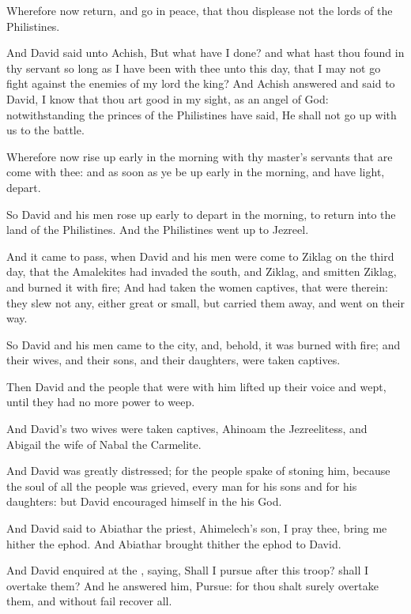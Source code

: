 \Verse Wherefore now return, and go in peace, that thou displease not the lords of the Philistines.

\Verse And David said unto Achish, But what have I done? and what hast thou found in thy servant so long as I have been with thee unto this day, that I may not go fight against the enemies of my lord the king?  \Verse And Achish answered and said to David, I know that thou art good in my sight, as an angel of God: notwithstanding the princes of the Philistines have said, He shall not go up with us to the battle.

\Verse Wherefore now rise up early in the morning with thy master's servants that are come with thee: and as soon as ye be up early in the morning, and have light, depart.

\Verse So David and his men rose up early to depart in the morning, to return into the land of the Philistines. And the Philistines went up to Jezreel.


\Chapter
\Verse And it came to pass, when David and his men were come to Ziklag on the third day, that the Amalekites had invaded the south, and Ziklag, and smitten Ziklag, and burned it with fire; \Verse And had taken the women captives, that were therein: they slew not any, either great or small, but carried them away, and went on their way.

\Verse So David and his men came to the city, and, behold, it was burned with fire; and their wives, and their sons, and their daughters, were taken captives.

\Verse Then David and the people that were with him lifted up their voice and wept, until they had no more power to weep.

\Verse And David's two wives were taken captives, Ahinoam the Jezreelitess, and Abigail the wife of Nabal the Carmelite.

\Verse And David was greatly distressed; for the people spake of stoning him, because the soul of all the people was grieved, every man for his sons and for his daughters: but David encouraged himself in the \LORD his God.

\Verse And David said to Abiathar the priest, Ahimelech's son, I pray thee, bring me hither the ephod. And Abiathar brought thither the ephod to David.

\Verse And David enquired at the \LORD, saying, Shall I pursue after this troop? shall I overtake them? And he answered him, Pursue: for thou shalt surely overtake them, and without fail recover all.

